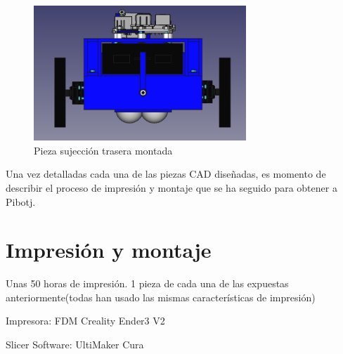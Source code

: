\begin{figure} [h!]
	\begin{center}
		\includegraphics[width=8cm]{figs/cap5/traseracon.png}
	\end{center}
	\caption{Pieza sujección trasera montada} 
	\label{fig:traseracon}
\end{figure}

Una vez detalladas cada una de las piezas \acs{CAD} diseñadas, es momento de describir el proceso de impresión y montaje que se ha seguido para obtener a Pibotj.
  
\section{Impresión y montaje}


Unas 50 horas de impresión.  1 pieza de cada una de las expuestas anteriormente(todas han usado las mismas características de impresión)

Impresora: FDM Creality Ender3 V2

Slicer Software: UltiMaker Cura

